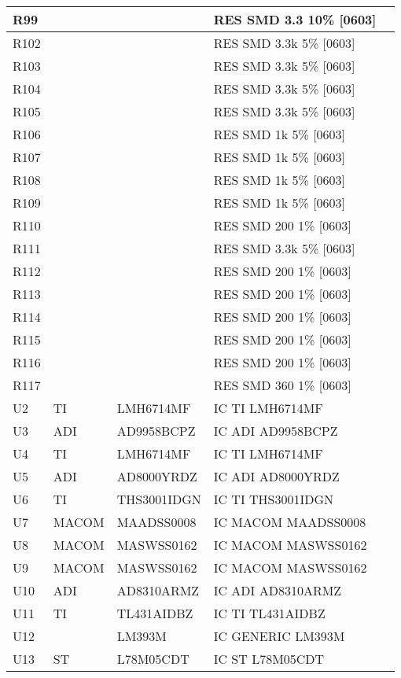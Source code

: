 \begin{longtable}{|l|l|l|l|l|}
\hline
R99 &  &  & RES SMD 3.3 10\% [0603] &  \\
\hline
R102 &  &  & RES SMD 3.3k 5\% [0603] &  \\
\hline
R103 &  &  & RES SMD 3.3k 5\% [0603] &  \\
\hline
R104 &  &  & RES SMD 3.3k 5\% [0603] &  \\
\hline
R105 &  &  & RES SMD 3.3k 5\% [0603] &  \\
\hline
R106 &  &  & RES SMD 1k 5\% [0603] &  \\
\hline
R107 &  &  & RES SMD 1k 5\% [0603] &  \\
\hline
R108 &  &  & RES SMD 1k 5\% [0603] &  \\
\hline
R109 &  &  & RES SMD 1k 5\% [0603] &  \\
\hline
R110 &  &  & RES SMD 200 1\% [0603] &  \\
\hline
R111 &  &  & RES SMD 3.3k 5\% [0603] &  \\
\hline
R112 &  &  & RES SMD 200 1\% [0603] &  \\
\hline
R113 &  &  & RES SMD 200 1\% [0603] &  \\
\hline
R114 &  &  & RES SMD 200 1\% [0603] &  \\
\hline
R115 &  &  & RES SMD 200 1\% [0603] &  \\
\hline
R116 &  &  & RES SMD 200 1\% [0603] &  \\
\hline
R117 &  &  & RES SMD 360 1\% [0603] &  \\
\hline
U2 & TI & LMH6714MF & IC TI LMH6714MF &  \\
\hline
U3 & ADI & AD9958BCPZ & IC ADI AD9958BCPZ &  \\
\hline
U4 & TI & LMH6714MF & IC TI LMH6714MF &  \\
\hline
U5 & ADI & AD8000YRDZ & IC ADI AD8000YRDZ &  \\
\hline
U6 & TI & THS3001IDGN & IC TI THS3001IDGN &  \\
\hline
U7 & MACOM & MAADSS0008 & IC MACOM MAADSS0008 &  \\
\hline
U8 & MACOM & MASWSS0162 & IC MACOM MASWSS0162 &  \\
\hline
U9 & MACOM & MASWSS0162 & IC MACOM MASWSS0162 &  \\
\hline
U10 & ADI & AD8310ARMZ & IC ADI AD8310ARMZ &  \\
\hline
U11 & TI & TL431AIDBZ & IC TI TL431AIDBZ &  \\
\hline
U12 &  & LM393M & IC GENERIC LM393M &  \\
\hline
U13 & ST & L78M05CDT & IC ST L78M05CDT &  \\

\end{longtable}
